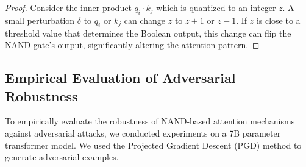 \documentclass[11pt]{article}
\theoremstyle{definition}
\begin{document}
\begin{proof}






Consider the inner product \( q_i \cdot k_j \) which is quantized to an integer \( z \). A small perturbation \( \delta \) to \( q_i \) or \( k_j \) can change \( z \) to \( z+1 \) or \( z-1 \). If \( z \) is close to a threshold value that determines the Boolean output, this change can flip the NAND gate’s output, significantly altering the attention pattern.






\end{proof}













\subsection{Empirical Evaluation of Adversarial Robustness}






To empirically evaluate the robustness of NAND-based attention mechanisms against adversarial attacks, we conducted experiments on a 7B parameter transformer model. We used the Projected Gradient Descent (PGD) method to generate adversarial examples.
\end{document}
